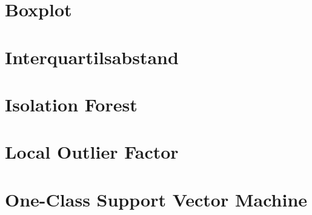\section{Boxplot}
\section{Interquartilsabstand}
\section{Isolation Forest}
\section{Local Outlier Factor}
\section{One-Class Support Vector Machine}

